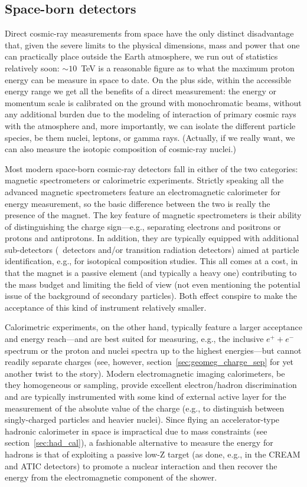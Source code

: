 \subsection{Space-born detectors}

Direct cosmic-ray measurements from space have the only distinct disadvantage that,
given the severe limits to the physical dimensions, mass and power that one can
practically place outside the Earth atmosphere, we run out of statistics relatively
soon: $\sim 10$~TeV is a reasonable figure as to what the maximum proton energy can
be measure in space to date. On the plus side, within the accessible energy range
we get all the benefits of a direct measurement: the energy or momentum scale is
calibrated on the ground with monochromatic beams, without any additional burden
due to the modeling of interaction of primary cosmic rays with the atmosphere and,
more importantly, we can isolate the different particle species, be them nuclei,
leptons, or gamma rays. (Actually, if we really want, we can also measure the
isotopic composition of cosmic-ray nuclei.)

Most modern space-born cosmic-ray detectors fall in either of the two categories:
magnetic spectrometers or calorimetric experiments. Strictly speaking all
the advanced magnetic spectrometers feature an electromagnetic calorimeter
for energy measurement, so the basic difference between the two is really the
presence of the magnet.
The key feature of magnetic spectrometers is their ability of distinguishing
the charge sign---e.g., separating electrons and positrons or protons and
antiprotons. In addition, they are typically equipped with additional
sub-detectors (\cherenkov\ detectors and/or transition radiation detectors) aimed
at particle identification, e.g., for isotopical composition studies. This all
comes at a cost, in that the magnet is a passive element (and typically a heavy one)
contributing to the mass budget and limiting the field of view (not even mentioning the
potential issue of the background of secondary particles). Both effect conspire
to make the acceptance of this kind of instrument relatively smaller.

Calorimetric experiments, on the other hand, typically feature a larger acceptance
and energy reach---and are best suited for measuring, e.g., the inclusive $e^+ + e^-$
spectrum or the proton and nuclei spectra up to the highest energies---but cannot
readily separate charges (see, however, section~\ref{sec:geomeg_charge_sep} for
yet another twist to the story).
Modern electromagnetic imaging calorimeters, be they homogeneous or sampling,
provide excellent electron/hadron discrimination and are typically instrumented
with some kind of external active layer for the measurement of the absolute
value of the charge (e.g., to distinguish between singly-charged particles and
heavier nuclei). Since flying an accelerator-type hadronic calorimeter in space
is impractical due to mass constraints (see section~\ref{sec:had_cal}),
a fashionable alternative to measure the energy for hadrons is that of
exploiting a passive low-Z target (as done, e.g., in the CREAM and ATIC
detectors) to promote a nuclear interaction and then recover the energy from
the electromagnetic component of the shower.

